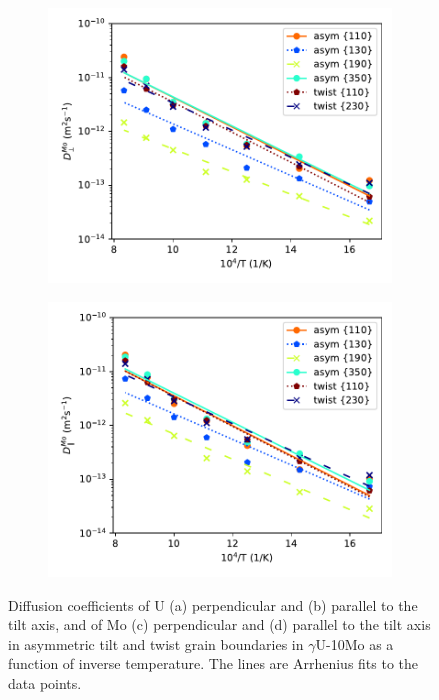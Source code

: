\documentclass{elsarticle}
\begin{document}
\begin{figure}[!ht]
\begin{subfigure}{0.49\textwidth}
	\centering
	\caption{}
	\includegraphics[width=\textwidth]{asym_twist_Mo_Dx.pdf}
\end{subfigure}
\begin{subfigure}{0.49\textwidth}
	\centering
	\caption{}
	\includegraphics[width=\textwidth]{asym_twist_Mo_Dz.pdf}
\end{subfigure}
\caption{Diffusion coefficients of U (a) perpendicular and (b) parallel to the tilt axis, and of Mo (c) perpendicular and (d) parallel to the tilt axis in asymmetric tilt and twist grain boundaries in $\gamma$U-10Mo as a function of inverse temperature. The lines are Arrhenius fits to the data points.}
\label{fig:asym}
\end{figure}
\end{document}
